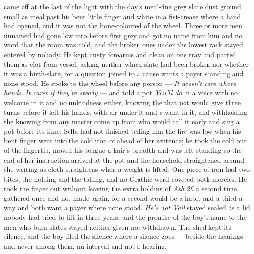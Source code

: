  came off  at the last of the light with the day's meal-fine grey slate dust ground small as meal past his bent little finger and white in a fist-crease where a hand had opened, and it was not the bone-coloured  of the wheel. Three or more men unnamed had gone low into  before first grey and got no name from him and no word that the room was cold, and the broken ones under the lowest rack stayed entered by nobody. He kept dusty forearms and clean on one tray and parted them as clot from vessel, asking neither which slate had been broken nor whether it was a birth-slate, for a question joined to a cause wants a payer standing and none stood. He spoke to the wheel before any person --- \emph{It doesn't care whose hands. It cares if they're steady} --- and told a pot \emph{You'll do} in a voice with no welcome in it and no unkindness either, knowing the  that pot would give three turns before it left his hands, with air under it and a want in it, and withholding the knowing from any master come up from  who would call it early and sing a pot before its time. Sella had not finished telling him the fire was low when his bent finger went into the cold iron of  ahead of her sentence; he took the cold out of the fingertip, moved his tongue a hair's breadth and was left standing so the end of her instruction arrived at the pot and the household straightened around the waiting as cloth straightens when a weight is lifted. One piece of iron had two bites, the holding and the taking, and no Grathic word covered both mercies. He took the finger out without leaving the extra holding of \emph{Ash 26} a second time, gathered once and not made again, for a second would be a habit and a third a way and both want a payer where none stood. \emph{He's not Vail} stayed sealed as a lid nobody had tried to lift in three years, and the promise of the boy's name to the men who burn slates stayed neither given nor withdrawn. The shed kept its silence, and the boy filed the silence where a silence goes --- beside the hearings and never among them, an interval and not a hearing.

